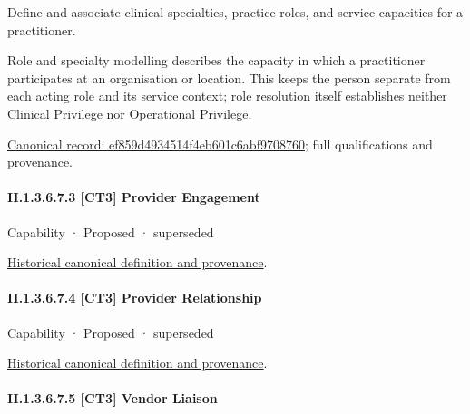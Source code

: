 Define and associate clinical specialties, practice roles, and service capacities for a practitioner.



Role and specialty modelling describes the capacity in which a practitioner participates at an organisation or location. This keeps the person separate from each acting role and its service context; role resolution itself establishes neither Clinical Privilege nor Operational Privilege.


{\footnotesize \href{../../../../continuum/strategy/capability/feature/ef859d4934514f4eb601c6abf9708760.md}{Canonical record: ef859d4934514f4eb601c6abf9708760}; full qualifications and provenance.}\par
\paragraph*{II.1.3.6.7.3 [CT3] Provider Engagement}
\label{navigation:II.1.3.6.7.3}

\label{element:a0777dbd9b0c4528817e99a7f34aa444}
{\small Capability · Proposed · superseded}\par
\href{../../../../continuum/strategy/capability/a0777dbd9b0c4528817e99a7f34aa444.md}{Historical canonical definition and provenance}.\par
\paragraph*{II.1.3.6.7.4 [CT3] Provider Relationship}
\label{navigation:II.1.3.6.7.4}

\label{element:3bb8a3d5b62a4b779442290fe8d5106c}
{\small Capability · Proposed · superseded}\par
\href{../../../../continuum/strategy/capability/3bb8a3d5b62a4b779442290fe8d5106c.md}{Historical canonical definition and provenance}.\par
\paragraph*{II.1.3.6.7.5 [CT3] Vendor Liaison}
\label{navigation:II.1.3.6.7.5}

